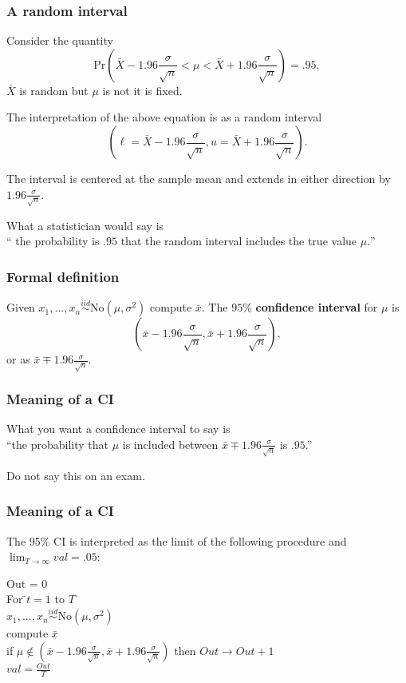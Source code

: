 \begin{frame}[fragile]\frametitle{A random interval}

{\tiny
Consider the quantity
$$\mbox{Pr}\left( \bar{X} - 1.96 \frac{\sigma}{\sqrt{n}}  < \mu  <  \bar{X} + 1.96 \frac{\sigma}{\sqrt{n}} \right) = .95,$$
$\bar{X}$ is random but $\mu$ is not it is fixed. 

The interpretation of the above equation is as a random interval
$$\left(\ell = \bar{X} - 1.96 \frac{\sigma}{\sqrt{n}} ,u = \bar{X} + 1.96
\frac{\sigma}{\sqrt{n}} \right).$$ 

The interval is centered at the sample mean and extends in either
direction by $1.96 \frac{\sigma}{\sqrt{n}}$. 

What a statistician would say is \\
`` the probability is $.95$ that the random interval includes
the true value $\mu.$''

}

\end{frame}

\begin{frame}[fragile]\frametitle{Formal definition}

\begin{defn}
Given $x_1,...,x_n \stackrel{iid}{\sim} \mbox{No}(\mu,\sigma^2)$
compute $\bar{x}$. The $95\%$ {\bf confidence interval} for $\mu$
is
$$\left(\bar{x} - 1.96 \frac{\sigma}{\sqrt{n}}, \bar{x} + 1.96 \frac{\sigma}{\sqrt{n}} \right),$$
or as $\bar{x} \mp 1.96 \frac{\sigma}{\sqrt{n}}.$
\end{defn}
\end{frame}

\begin{frame}[fragile]\frametitle{Meaning of a CI}
What you want a confidence interval to say is  \\
``the probability that $\mu$ is included between 
$\bar{x} \mp 1.96 \frac{\sigma}{\sqrt{n}}$ is $.95$.'' \\ 

\vspace{.1in}

Do not say this on an exam.

\end{frame}

\begin{frame}[fragile]\frametitle{Meaning of a CI}

{\tiny
The $95\%$ CI is interpreted as the limit of the following procedure
and $\lim_{T \rightarrow \infty} val = .05$: \\
\begin{tabbing}
Out = 0 \\
For \=$t=1$ to $T$ \\
\> $x_1,...,x_n \stackrel{iid}{\sim} \mbox{No}(\mu,\sigma^2)$ \\
\> compute $\bar{x}$ \\
\> if $\mu \not \in \left(\bar{x} - 1.96 \frac{\sigma}{\sqrt{n}},
  \bar{x} + 1.96 \frac{\sigma}{\sqrt{n}} \right)$  then $Out \rightarrow Out +1$ \\
$val = \frac{Out}{T}$ 
\end{tabbing}
}
\end{frame}


